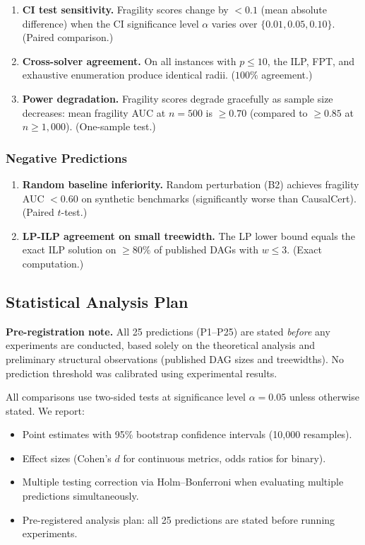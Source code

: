 \documentclass[11pt,a4paper]{article}
\theoremstyle{definition}
\theoremstyle{remark}
\begin{document}
\begin{enumerate}[label=\textbf{P\arabic*:},resume]
\item \textbf{CI test sensitivity.} Fragility scores change by $< 0.1$ (mean absolute
  difference) when the CI significance level $\alpha$ varies over $\{0.01, 0.05, 0.10\}$.
  (Paired comparison.)

\item \textbf{Cross-solver agreement.} On all instances with $p \leq 10$, the ILP,
  FPT, and exhaustive enumeration produce identical radii. ($100\%$ agreement.)

\item \textbf{Power degradation.} Fragility scores degrade gracefully as sample size
  decreases: mean fragility AUC at $n = 500$ is $\geq 0.70$ (compared to $\geq 0.85$
  at $n \geq 1{,}000$). (One-sample test.)
\end{enumerate}

\subsubsection{Negative Predictions}

\begin{enumerate}[label=\textbf{P\arabic*:},resume]
\item \textbf{Random baseline inferiority.} Random perturbation (B2) achieves fragility
  AUC $< 0.60$ on synthetic benchmarks (significantly worse than CausalCert). (Paired
  $t$-test.)

\item \textbf{LP-ILP agreement on small treewidth.} The LP lower bound equals the exact
  ILP solution on $\geq 80\%$ of published DAGs with $w \leq 3$. (Exact computation.)
\end{enumerate}

\subsection{Statistical Analysis Plan}

\noindent\textbf{Pre-registration note.} All 25 predictions (P1--P25) are stated
\emph{before} any experiments are conducted, based solely on the theoretical analysis
and preliminary structural observations (published DAG sizes and treewidths). No
prediction threshold was calibrated using experimental results.

All comparisons use two-sided tests at significance level $\alpha = 0.05$ unless
otherwise stated. We report:
\begin{itemize}
  \item Point estimates with 95\% bootstrap confidence intervals (10{,}000 resamples).
  \item Effect sizes (Cohen's $d$ for continuous metrics, odds ratios for binary).
  \item Multiple testing correction via Holm--Bonferroni when evaluating multiple
    predictions simultaneously.
  \item Pre-registered analysis plan: all 25 predictions are stated before running
    experiments.
\end{itemize}
\end{document}
